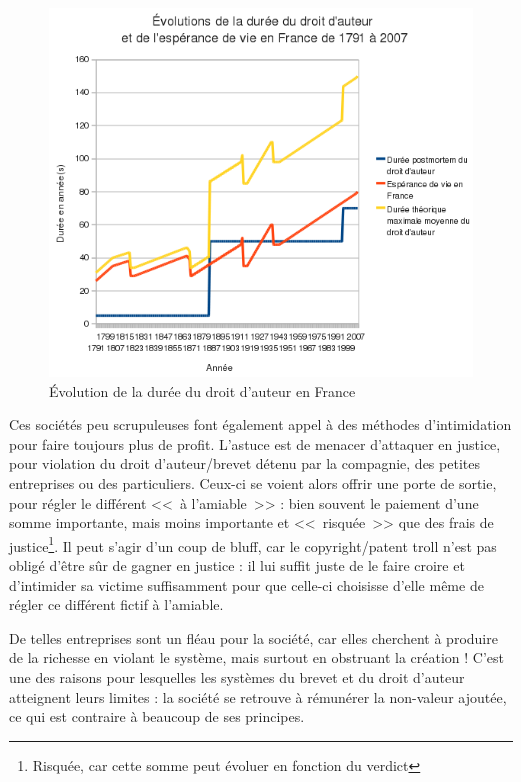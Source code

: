 \begin{figure}[H]
\center
\includegraphics[scale=.85]{images/duree_du_droit_d'auteur_en_France_depuis_1791.png}
\caption{Évolution de la durée du droit d'auteur en France}
\end{figure}

Ces sociétés peu scrupuleuses font également appel à des méthodes d'intimidation pour faire toujours plus de profit.
L'astuce est de menacer d'attaquer en justice, pour violation du droit d'auteur/brevet détenu par la compagnie, des petites entreprises ou des particuliers.
Ceux-ci se voient alors offrir une porte de sortie, pour régler le différent <<~à l'amiable~>> : bien souvent le paiement d'une somme importante, mais moins importante et <<~risquée~>> que des frais de justice\footnote{Risquée, car cette somme peut évoluer en fonction du verdict}.
Il peut s'agir d'un coup de bluff, car le copyright/patent troll n'est pas obligé d'être sûr de gagner en justice : il lui suffit juste de le faire croire et d'intimider sa victime suffisamment pour que celle-ci choisisse d'elle même de régler ce différent fictif à l'amiable.

De telles entreprises sont un fléau pour la société, car elles cherchent à produire de la richesse en violant le système, mais surtout en obstruant la création !
C'est une des raisons pour lesquelles les systèmes du brevet et du droit d'auteur atteignent leurs limites : la société se retrouve à rémunérer la non-valeur ajoutée, ce qui est contraire à beaucoup de ses principes.

